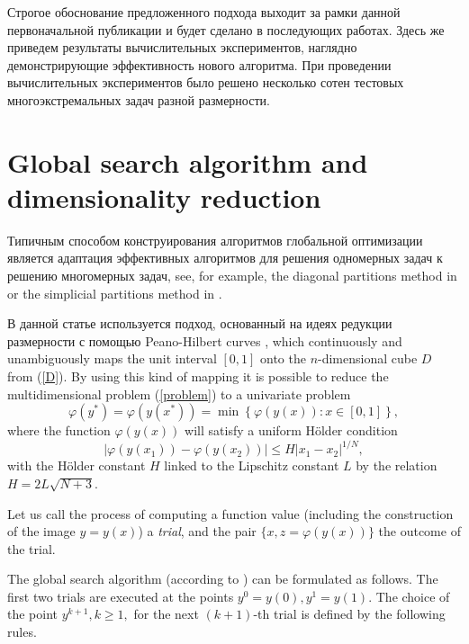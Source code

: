 \documentclass[runningheads]{llncs}
\begin{document}
Строгое обоснование предложенного подхода выходит за рамки данной первоначальной публикации и будет сделано в последующих работах. Здесь же приведем результаты вычислительных экспериментов, наглядно демонстрирующие эффективность нового алгоритма. При проведении вычислительных экспериментов было решено несколько сотен тестовых многоэкстремальных задач разной размерности.


\section{Global search algorithm and dimensionality reduction}

Типичным способом конструирования алгоритмов глобальной оптимизации является адаптация эффективных алгоритмов для решения одномерных задач к решению многомерных задач, see, for example, the diagonal partitions method in \cite{Sergeyev2006} or the simplicial partitions method in \cite{Zilinskas2008}.

В данной статье используется подход, основанный на идеях редукции размерности с помощью Peano-Hilbert curves \cite{Strongin2000,Sergeyev2013}, which continuously and unambiguously maps the unit interval $[0,1]$ onto the $n$-dimensional cube $D$ from (\ref{D}). By using this kind of mapping it is possible to reduce the multidimensional problem (\ref{problem}) to a univariate problem
\[
\varphi(y^\ast)=\varphi(y(x^\ast))=\min{\left\{\varphi(y(x)): x\in[0,1]\right\}},
\]
where the function $\varphi(y(x))$ will satisfy a uniform H{\"o}lder condition
\[
\left|\varphi(y(x_1))-\varphi(y(x_2))\right|\leq H\left|x_1-x_2\right|^{1/N},
\]
with the H{\"o}lder constant $H$ linked to the Lipschitz constant $L$ by the relation
$ H=2 L \sqrt{N+3}$.

Let us call the process of computing a function value (including the construction of the image $y=y(x)$) a \textit{trial}, and the pair $\{x, z = \varphi(y(x))\}$ the outcome of the trial.

The global search algorithm (according to \cite{Strongin2000}) can be formulated as follows.
The first two trials are executed at 
the points $y^0=y(0), y^1=y(1)$. The choice of the point $y^{k+1},k\geq 1,$  
for the next $(k+1)$-th trial is defined by the following rules.
\end{document}
